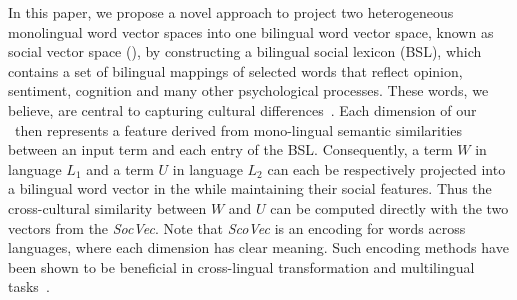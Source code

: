 In this paper, we propose a novel approach to project 
two heterogeneous monolingual word vector spaces into 
one bilingual word vector space, known as 
social vector space (\textit{\socvec}), 
by constructing a bilingual social lexicon (BSL), which
contains a set of bilingual mappings of selected words
that reflect opinion, sentiment, cognition and many other psychological 
processes. 
These words, we believe, are central to capturing cultural
differences~\cite{Garimella2016IdentifyingCD}.
Each dimension of our \textit{\socvec}~then represents a feature 
derived from mono-lingual semantic similarities between an input term and 
each entry of the BSL. 
Consequently, a term $W$ in language $L_1$ and a term $U$ in 
language $L_2$ can each be respectively projected 
into a bilingual word vector in the \textit{\socvec} while maintaining
their social features. Thus the cross-cultural similarity 
between $W$ and $U$ can be computed directly with the two vectors 
from the \textit{SocVec}. 
Note that \textit{ScoVec} is an encoding for words across languages, where each dimension has 
clear meaning. Such encoding methods have been shown to be beneficial in 
cross-lingual transformation and multilingual tasks~\cite{DBLP:journals/tacl/Berend17,DBLP:journals/corr/SmithTHH17}.

